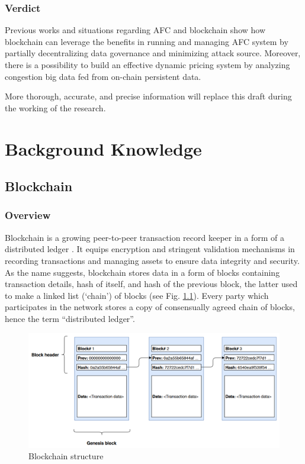 \documentclass[a4paper,12pt,oneside, utf8x]{report}
\begin{document}
\subsection{Verdict}

Previous works and situations regarding AFC and blockchain show how blockchain can leverage the benefits in running and managing AFC system by partially decentralizing data governance and minimizing attack source. Moreover, there is a possibility to build an effective dynamic pricing system by analyzing congestion big data fed from on-chain persistent data.

More thorough, accurate, and precise information will replace this draft during the working of the research.

\chapter{Background Knowledge}
\label{cbknowledge}

\section{Blockchain}
\subsection{Overview}
Blockchain is a growing peer-to-peer transaction record keeper in a form of a distributed ledger \cite{a7}. It equips encryption and stringent validation mechanisms in recording transactions and managing assets to ensure data integrity and security. As the name suggests, blockchain stores data in a form of blocks containing transaction details, hash of itself, and hash of the previous block, the latter used to make a linked list (‘chain’) of blocks (see Fig. \ref{f31}). Every party which participates in the network stores a copy of consensually agreed chain of blocks, hence the term “distributed ledger”.

    \begin{figure}[H]
        \centering
        \includegraphics[width=.7\textwidth]{figures/3-1.png}
        \caption{Blockchain structure}
        \label{f31}
    \end{figure}
    
\end{document}
